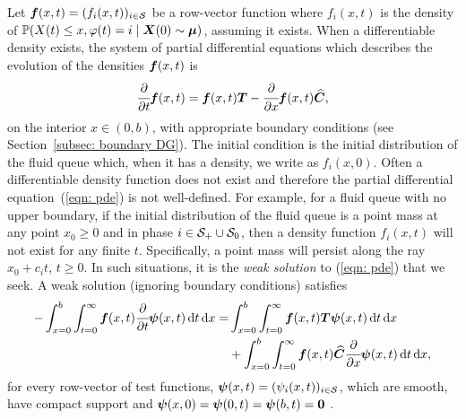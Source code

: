 Let \(\boldsymbol f(x,t) = (f_i(x,t))_{i\in\mathcal{S}}\) be a row-vector function where \(f_i(x,t)\) is the density of \(\mathbb P(X(t)\leq x, \varphi(t) = i\mid \boldsymbol X(0)\sim \boldsymbol \mu )\), assuming it exists. When a differentiable density exists, the system of partial differential equations which describes the evolution of the densities \(\boldsymbol f(x,t)\) is 
\begin{align}
	\cfrac{\partial}{\partial t} \boldsymbol f(x,t) = \boldsymbol f(x,t)\boldsymbol T - \cfrac{\partial}{\partial x}\boldsymbol f(x,t)\widehat{\boldsymbol C},\label{eqn: pde}
\end{align}
on the interior \(x\in(0,b)\), with appropriate boundary conditions (see Section~\ref{subsec: boundary DG}). The initial condition is the initial distribution of the fluid queue which, when it has a density, we write as \(f_i(x,0)\). Often a differentiable density function does not exist and therefore the partial differential equation~(\ref{eqn: pde}) is not well-defined. For example, for a fluid queue with no upper boundary, if the initial distribution of the fluid queue is a point mass at any point \(x_0\geq 0\) and in phase \(i\in\mathcal{S}_+\cup\mathcal{S}_0\), then a density function \(f_i(x,t)\) will not exist for any finite \(t\). Specifically, a point mass will persist along the ray \(x_0+c_it\), \(t\geq 0\). In such situations, it is the \emph{weak solution} to (\ref{eqn: pde}) that we seek. A weak solution (ignoring boundary conditions) satisfies
\begin{align}
	-\int_{x=0}^b\int_{t=0}^\infty \boldsymbol f(x,t)\cfrac{\partial}{\partial t} \boldsymbol \psi(x,t)\, \mathrm{d} t \, \mathrm{d} x= &\int_{x=0}^b\int_{t=0}^\infty\boldsymbol f(x,t)\boldsymbol T\boldsymbol \psi(x,t)\, \mathrm{d} t \, \mathrm{d} x \nonumber 
	\\&{} + \int_{x=0}^b \int_{t=0}^\infty\boldsymbol f(x,t)\widehat{\boldsymbol C} \cfrac{\partial}{\partial x} \boldsymbol \psi(x,t)\, \mathrm{d} t \, \mathrm{d} x,\label{eqn: weak pde}
\end{align}
for every row-vector of test functions, \(\boldsymbol \psi(x,t) = ( \psi_i(x,t))_{i\in\mathcal{S}}\), which are smooth, have compact support and \(\boldsymbol \psi(x,0)=\boldsymbol \psi(0,t) = \boldsymbol \psi(b,t)=\boldsymbol 0\) \cite[Chapter~10]{borthwickBook}. 

